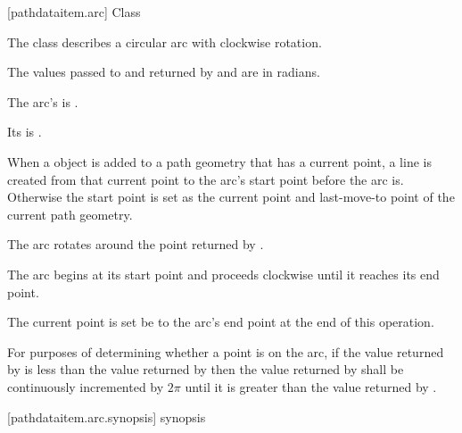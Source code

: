  [pathdataitem.arc] {Class }

\pnum
{}
The class  describes a circular arc with clockwise rotation.

\pnum
The values passed to and returned by  and  are in radians.

\pnum
The arc's  is .

\pnum
Its  is .

\pnum
When a  object is added to a path geometry that has a current point, a line is created from that current point to the arc's start point before the arc is. Otherwise the start point is set as the current point and last-move-to point of the current path geometry.

\pnum
The arc rotates around the point returned by .

\pnum
The arc begins at its start point and proceeds clockwise until it reaches its end point.

\pnum
The current point is set be to the arc's end point at the end of this operation.

\pnum
For purposes of determining whether a point is on the arc, if the value returned by  is less than the value returned by  then the value returned by  shall be continuously incremented by $2\pi$ until it is greater than the value returned by .

 [pathdataitem.arc.synopsis] { synopsis}

